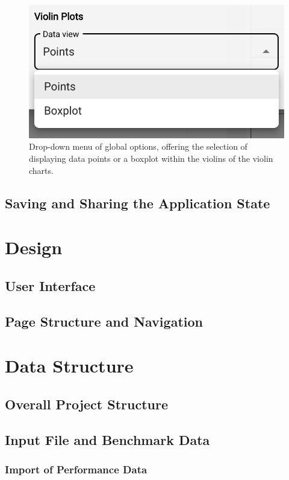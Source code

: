 \begin{figure}[h]
  \centering
  \includegraphics[width=0.4\linewidth]{figures/chart-configuration-violin.png}
  \caption{Drop-down menu of global options, offering the selection of displaying data points or a boxplot within the violins of the violin charts.}
  \label{fig:chart-configuration-violin}
\end{figure}

\subsection{Saving and Sharing the Application State}


\section{Design}
\subsection{User Interface}
\subsection{Page Structure and Navigation}
\subsubsection{}

\section{Data Structure}
\subsection{Overall Project Structure}
\subsection{Input File and Benchmark Data}


\subsubsection{Import of Performance Data}

